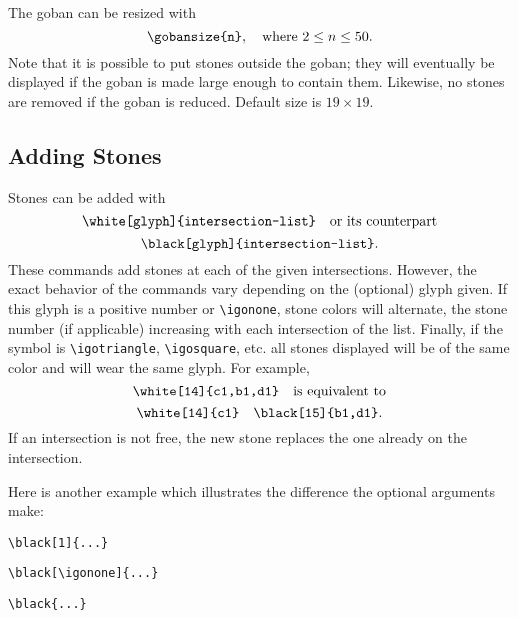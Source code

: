 \documentclass[fleqn]{article}
\begin{document}
The goban can be resized with
\begin{displaymath}
	\verb|\gobansize{n}|, \quad\text{where $2 \leq n \leq 50$}.
\end{displaymath}
Note that it is possible to put stones outside the goban; they will eventually be displayed if the goban is made large enough to contain them. Likewise, no stones are removed if the goban is reduced. Default size is $19 \times 19$.

\subsection{Adding Stones}
\label{sec:stones}

Stones can be added with \[\verb|\white[glyph]{intersection-list}| \quad\text{or its counterpart}\] \[\verb|\black[glyph]{intersection-list}|.\] These commands add stones at each of the given intersections. However, the exact behavior of the commands vary depending on the (optional) glyph given. If this glyph is a positive number or \verb|\igonone|, stone colors will alternate, the stone number (if applicable) increasing with each intersection of the list. Finally, if the symbol is \verb|\igotriangle|, \verb|\igosquare|, etc. all stones displayed will be of the same color and will wear the same glyph. For example, \[\verb|\white[14]{c1,b1,d1}| \quad\text{is equivalent to}\] \[\verb|\white[14]{c1}| \quad \verb|\black[15]{b1,d1}|.\] If an intersection is not free, the new stone replaces the one already on the intersection.

Here is another example which illustrates the difference the optional arguments make:

\medskip
\begin{minipage}[c][1.0\height][c]{0.32\textwidth}
\begin{center}
	\cleargoban
	\showgoban[a1,j8]\break
	\verb|\black[1]{...}|
\end{center}
\end{minipage}
\begin{minipage}[c][1.0\height][c]{0.33\textwidth}
\begin{center}
	\cleargoban
	\showgoban[a1,j8]\break
	\verb|\black[\igonone]{...}|
\end{center}
\end{minipage}
\begin{minipage}[c][1.0\height][c]{0.32\textwidth}
\begin{center}
	\cleargoban
	\showgoban[a1,j8]\break
	\verb|\black{...}|
\end{center}
\end{minipage}
\medskip
\end{document}
